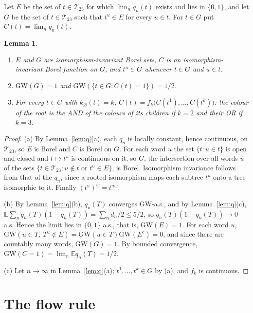 \documentclass[11pt]{amsart}
\newtheorem{lemma}{Lemma}
\theoremstyle{remark}
\numberwithin{equation}{section}
\newcommand{\E}{\mathbb E}
\newcommand{\T}{\mathcal T}
\newcommand{\GW}{\mathrm{GW}}
\begin{document}
Let $E$ be the set of $t\in\T_{23}$ for which $\lim_nq_n(t)$ exists and lies in $\{0,1\}$, and let $G$ be the set of $t\in\T_{23}$ such that $t^u\in E$ for every $u\in t$. For $t\in G$ put $C(t)=\lim_nq_n(t)$.

\begin{lemma}\label{lem:colour}
\begin{enumerate}[label=\textup{(\alph*)}]
\item $E$ and $G$ are isomorphism-invariant Borel sets, $C$ is an isomorphism-invariant Borel function on $G$, and $t^u\in G$ whenever $t\in G$ and $u\in t$.
\item $\GW(G)=1$ and $\GW(\{t\in G:C(t)=1\})=1/2$.
\item For every $t\in G$ with $k_\varnothing(t)=k$, $C(t)=f_k\bigl(C(t^1),\dots,C(t^k)\bigr)$: the colour of the root is the AND of the colours of its children if $k=2$ and their OR if $k=3$.
\end{enumerate}
\end{lemma}

\begin{proof}
(a) By Lemma~\ref{lem:q}(a), each $q_n$ is locally constant, hence continuous, on $\T_{23}$, so $E$ is Borel and $C$ is Borel on $G$. For each word $u$ the set $\{t:u\in t\}$ is open and closed and $t\mapsto t^u$ is continuous on it, so $G$, the intersection over all words $u$ of the sets $\{t\in\T_{23}:u\notin t\text{ or }t^u\in E\}$, is Borel. Isomorphism invariance follows from that of the $q_n$, since a rooted isomorphism maps each subtree $t^u$ onto a tree isomorphic to it. Finally $(t^u)^w=t^{uw}$.

(b) By Lemma~\ref{lem:q}(b), $q_n(T)$ converges $\GW$-a.s., and by Lemma~\ref{lem:q}(c), $\E\sum_nq_n(T)(1-q_n(T))=\sum_nd_n/2\le5/2$, so $q_n(T)(1-q_n(T))\to0$ a.s. Hence the limit lies in $\{0,1\}$ a.s., that is, $\GW(E)=1$. For each word $u$, $\GW(u\in T,\ T^u\notin E)=\GW(u\in T)\GW(E^c)=0$, and since there are countably many words, $\GW(G)=1$. By bounded convergence, $\GW(C=1)=\lim_n\E q_n(T)=1/2$.

(c) Let $n\to\infty$ in Lemma~\ref{lem:q}(a); $t^1,\dots,t^k\in G$ by (a), and $f_k$ is continuous.
\end{proof}

\section{The flow rule}\label{sec:proof}
\end{document}
